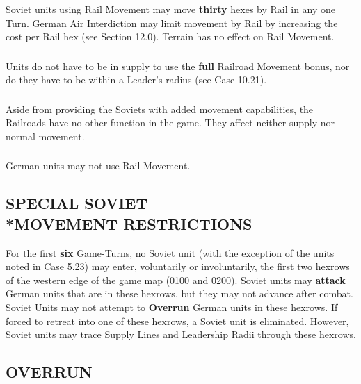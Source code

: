 \subsubsection{} Soviet units using Rail Movement may move \textbf{thirty} hexes by Rail in any one Turn. German Air Interdiction may limit movement by Rail by increasing the cost per Rail hex (see Section 12.0). Terrain has no effect on Rail Movement.

\subsubsection{} Units do not have to be in supply to use the \textbf{full} Railroad Movement bonus, nor do they have to be within a Leader's radius (see Case 10.21).

\subsubsection{} Aside from providing the Soviets with added movement capabilities, the Railroads have no other function in the game. They affect neither supply nor normal movement.

\subsubsection{} German units may not use Rail Movement.

\subsection{SPECIAL SOVIET\\*MOVEMENT RESTRICTIONS}

For the first \textbf{six} Game-Turns, no Soviet unit (with the exception of the units noted in Case 5.23) may enter, voluntarily or involuntarily, the first two hexrows of the western edge of the game map (0100 and 0200). Soviet units may \textbf{attack} German units that are in these hexrows, but they may not advance after combat. Soviet Units may not attempt to \textbf{Overrun} German units in these hexrows. If forced to retreat into one of these hexrows, a Soviet unit is eliminated. However, Soviet units may trace Supply Lines and Leadership Radii through these hexrows.

\subsection{OVERRUN}

